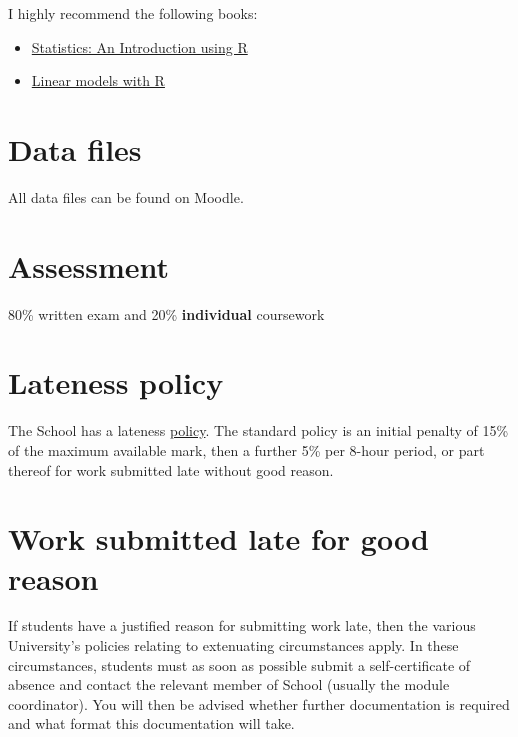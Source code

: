 \documentclass[
  oneside]{krantz}
\providecommand{\tightlist}{%
  \setlength{\itemsep}{0pt}\setlength{\parskip}{0pt}}
\theoremstyle{definition}
\theoremstyle{definition}
\theoremstyle{definition}
\theoremstyle{remark}
\begin{document}
I highly recommend the following books:

\begin{itemize}
\tightlist
\item
  \href{https://www.wiley.com/en-gb/Statistics\%3A+An+Introduction+using+R-p-9780470022986}{Statistics: An Introduction using R}
\item
  \href{https://www.crcpress.com/Linear-Models-with-R/Faraway/p/book/9781439887332}{Linear models with R}
\end{itemize}

\hypertarget{data-files}{%
\section*{Data files}\label{data-files}}


All data files can be found on Moodle.

\hypertarget{assessment}{%
\section*{Assessment}\label{assessment}}


80\% written exam and 20\% \textbf{individual} coursework

\hypertarget{lateness-policy}{%
\section*{Lateness policy}\label{lateness-policy}}


The School has a lateness \href{https://www.st-andrews.ac.uk/maths/current/ug/information/latepenalties/}{policy}. The standard policy is an initial penalty of 15\% of the maximum available mark, then a further 5\% per 8-hour period, or part thereof for work submitted late without good reason.

\hypertarget{work-submitted-late-for-good-reason}{%
\section*{Work submitted late for good reason}\label{work-submitted-late-for-good-reason}}


If students have a justified reason for submitting work late, then the various University's policies relating to extenuating circumstances apply. In these circumstances, students must as soon as possible submit a self-certificate of absence and contact the relevant member of School (usually the module coordinator). You will then be advised whether further documentation is required and what format this documentation will take.
\end{document}
